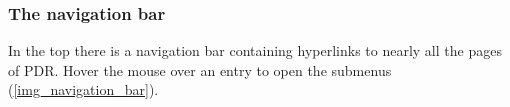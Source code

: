 \subsubsection{The navigation bar}
In the top there is a navigation bar containing hyperlinks to nearly all the pages of PDR. Hover the mouse over an entry to open the submenus (\autoref{img_navigation_bar}).
\begin{multicols}{3}
\begin{description}
    \item {}
    \begin{description}
        \item {}
        \item {}
    \end{description}
    \item {}
    \begin{description}
    \item {}
    \item {}
    \item {}
    \end{description}
    \columnbreak
    \item {}
    \begin{description}
    \item {}
    \item {}
    \end{description}
    \item {}
    \begin{description}
    \item {}
    \item {}
    \item {}
    \end{description}
    \item {}
    \begin{description}
    \item {}
    \item {}
    \item {}
    \end{description}
    \columnbreak
    \item {}

\end{description}
\end{multicols}
